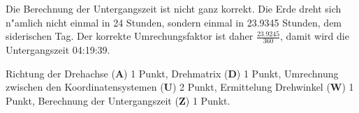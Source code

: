 \begin{diskussion}
Die Berechnung der Untergangszeit ist nicht ganz korrekt. Die Erde dreht
sich n"amlich nicht einmal in 24 Stunden, sondern einmal in 23.9345 Stunden,
dem siderischen Tag.
Der korrekte Umrechungsfaktor ist daher $\frac{23.9245}{360}$, damit
wird die Untergangszeit 04:19:39.
\end{diskussion}

\begin{bewertung}
Richtung der Drehachse (\textbf{A}) 1 Punkt,
Drehmatrix (\textbf{D}) 1 Punkt,
Umrechnung zwischen den Koordinatensystemen (\textbf{U}) 2 Punkt,
Ermittelung Drehwinkel (\textbf{W}) 1 Punkt,
Berechnung der Untergangszeit (\textbf{Z}) 1 Punkt.
\end{bewertung}
